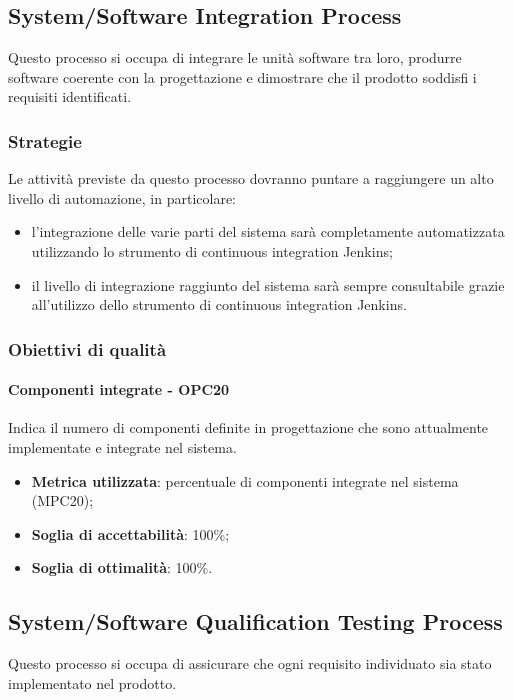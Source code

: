 \documentclass[PdQ.tex]{subfiles}
\begin{document}
	\subsection{System/Software Integration Process}
		Questo processo si occupa di integrare le unità software tra loro, produrre software coerente con la progettazione e dimostrare che il
		prodotto soddisfi i requisiti identificati.
		
		\subsubsection{Strategie}
		Le attività previste da questo processo dovranno puntare a raggiungere un alto livello di automazione, in particolare:
		\begin{itemize}
			\item l’integrazione delle varie parti del sistema sarà completamente automatizzata utilizzando lo strumento di continuous integration Jenkins;
			\item il livello di integrazione raggiunto del sistema sarà sempre consultabile grazie all’utilizzo dello strumento di continuous integration Jenkins.
		\end{itemize}
		
		\subsubsection{Obiettivi di qualità}
			\paragraph{Componenti integrate - OPC20}
				Indica il numero di componenti definite in progettazione che sono attualmente implementate e integrate nel sistema.
				\begin{itemize}
					\item \textbf{Metrica utilizzata}: percentuale di componenti integrate nel sistema (MPC20);
					\item \textbf{Soglia di accettabilità}: 100\%;
					\item \textbf{Soglia di ottimalità}: 100\%.
				\end{itemize}
		
	\subsection{System/Software Qualification Testing Process}
		Questo processo si occupa di assicurare che ogni requisito individuato sia stato implementato nel prodotto. 
		
\end{document}
